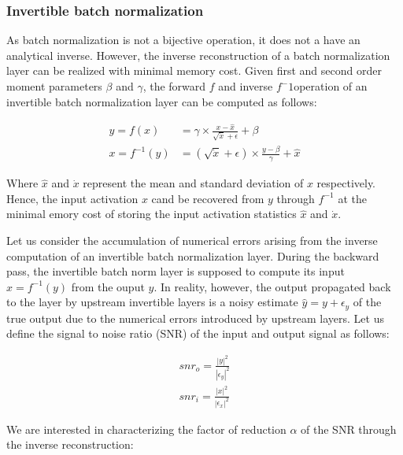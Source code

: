\documentclass[twocolumn]{bmcart}
\begin{document}
\subsubsection{Invertible batch normalization}

As batch normalization is not a bijective operation, it does not a have an analytical inverse.
However, the inverse reconstruction of a batch normalization layer can be realized with minimal memory cost.
Given first and second order moment parameters $\beta$ and $\gamma$, the forward $f$ and inverse $f^-1$operation of an invertible batch normalization layer can be computed as follows:

\begin{subequations}
	\begin{align}
	y = f(x) &= \gamma \times \frac{x - \hat{x}}{\sqrt{\dot{x}} + \epsilon} + \beta \\
	x = f^{-1}(y) &= (\sqrt{\dot{x}} + \epsilon) \times \frac{y -  \beta}{\gamma}  + \hat{x}
	\end{align}
\end{subequations}

Where $\hat{x}$ and $\dot{x}$ represent the mean and standard deviation of $x$ respectively.
Hence, the input activation $x$ cand be recovered from $y$ through $f^{-1}$ at the minimal emory cost of storing the input activation statistics $\hat{x}$ and $\dot{x}$.

Let us consider the accumulation of numerical errors arising from the inverse computation of an invertible batch normalization layer.
During the backward pass, the invertible batch norm layer is supposed to compute its input $x=f^{-1}(y)$ from the ouput $y$. 
In reality, however, the output propagated back to the layer by upstream invertible layers is a noisy estimate $\hat{y}=y+\epsilon_y$ of the true output due to the numerical errors introduced by upstream layers. 
Let us define the signal to noise ratio (SNR) of the input and output signal as follows:

\begin{subequations}
	\begin{align}
	snr_o = \frac{|y|^2}{|\epsilon_y|^2} \\
	snr_i = \frac{|x|^2}{|\epsilon_x|^2}  
	\end{align}
\end{subequations}

We are interested in characterizing the factor of reduction $\alpha$ of the SNR through the inverse reconstruction:
\end{document}
